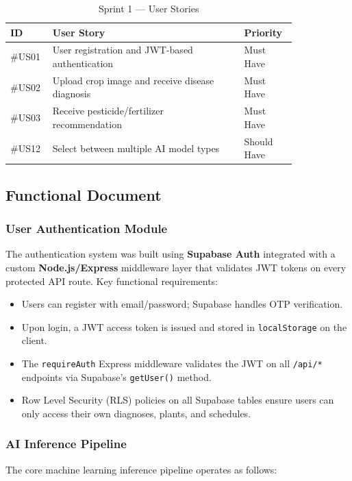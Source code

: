 \documentclass[12pt,a4paper]{report}
\begin{document}
\begin{table}[H]
\centering
\caption{Sprint 1 — User Stories}
\label{tab:sprint1us}
\begin{tabular}{p{0.08\linewidth} p{0.60\linewidth} p{0.15\linewidth}}
\toprule
\textbf{ID} & \textbf{User Story} & \textbf{Priority} \\
\midrule
\#US01 & User registration and JWT-based authentication & Must Have \\
\#US02 & Upload crop image and receive disease diagnosis & Must Have \\
\#US03 & Receive pesticide/fertilizer recommendation & Must Have \\
\#US12 & Select between multiple AI model types  & Should Have \\
\bottomrule
\end{tabular}
\end{table}

\subsection{Functional Document}

\subsubsection{User Authentication Module}
The authentication system was built using \textbf{Supabase Auth} integrated with a custom \textbf{Node.js/Express} middleware layer that validates JWT tokens on every protected API route. Key functional requirements:

\begin{itemize}
  \item Users can register with email/password; Supabase handles OTP verification.
  \item Upon login, a JWT access token is issued and stored in \texttt{localStorage} on the client.
  \item The \texttt{requireAuth} Express middleware validates the JWT on all \texttt{/api/*} endpoints via Supabase's \texttt{getUser()} method.
  \item Row Level Security (RLS) policies on all Supabase tables ensure users can only access their own diagnoses, plants, and schedules.
\end{itemize}

\subsubsection{AI Inference Pipeline}
The core machine learning inference pipeline operates as follows:
\end{document}
